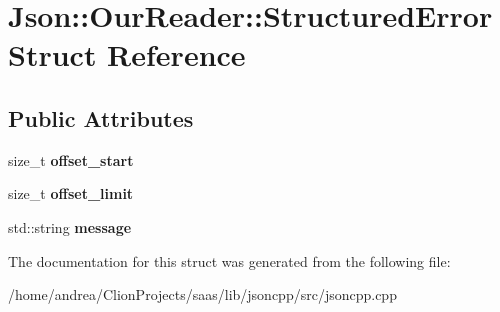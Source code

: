 \hypertarget{struct_json_1_1_our_reader_1_1_structured_error}{}\section{Json\+:\+:Our\+Reader\+:\+:Structured\+Error Struct Reference}
\label{struct_json_1_1_our_reader_1_1_structured_error}
\subsection*{Public Attributes}
\begin{DoxyCompactItemize}
\item 
size\+\_\+t {\bfseries offset\+\_\+start}\hypertarget{struct_json_1_1_our_reader_1_1_structured_error_a4eec161c2a6b4c89b6eb3d8d83834443}{}\label{struct_json_1_1_our_reader_1_1_structured_error_a4eec161c2a6b4c89b6eb3d8d83834443}

\item 
size\+\_\+t {\bfseries offset\+\_\+limit}\hypertarget{struct_json_1_1_our_reader_1_1_structured_error_a6bab2650e5230fc15427b309de79fdbe}{}\label{struct_json_1_1_our_reader_1_1_structured_error_a6bab2650e5230fc15427b309de79fdbe}

\item 
std\+::string {\bfseries message}\hypertarget{struct_json_1_1_our_reader_1_1_structured_error_adc8a757b6452cc6ab14fb90b933b3414}{}\label{struct_json_1_1_our_reader_1_1_structured_error_adc8a757b6452cc6ab14fb90b933b3414}

\end{DoxyCompactItemize}


The documentation for this struct was generated from the following file\+:\begin{DoxyCompactItemize}
\item 
/home/andrea/\+Clion\+Projects/saas/lib/jsoncpp/src/jsoncpp.\+cpp\end{DoxyCompactItemize}
